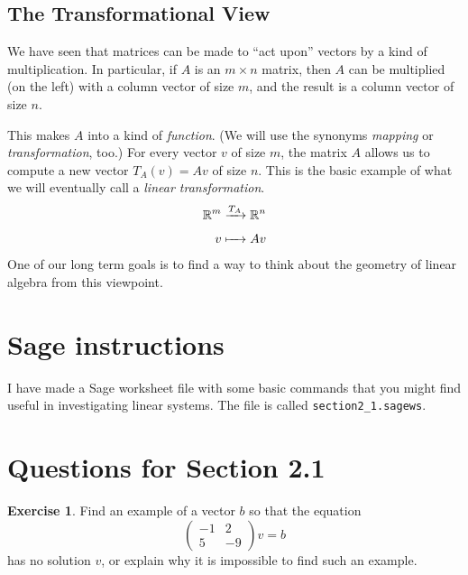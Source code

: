 \documentclass[11pt]{amsart}
\theoremstyle{definition}
\newtheorem{exercise}{Exercise}
\begin{document}
\subsection{The Transformational View}

We have seen that matrices can be made to ``act upon'' vectors by a kind of multiplication. In particular, if $A$ is an $m \times n$ matrix, then $A$ can be multiplied (on the left) with a column vector of size $m$, and the result is a column vector of size $n$.

This makes $A$ into a kind of \emph{function}. (We will use the synonyms \emph{mapping} or \emph{transformation}, too.)
For every vector $v$ of size $m$, the matrix $A$ allows us to compute a new vector $T_A(v) = Av$ of size $n$. This is the basic example of what we will eventually call a \emph{linear transformation}.
\begin{align*}
\mathbb{R}^m & \xrightarrow[]{T_A} \mathbb{R}^n \\
v & \xmapsto[]{\phantom{T_A}} Av
\end{align*}
One of our long term goals is to find a way to think about the geometry of linear algebra from this viewpoint.



\section{Sage instructions}

I have made a Sage worksheet file with some basic commands that you might find useful in investigating linear systems. The file is called \texttt{section2\_1.sagews}.


\section{Questions for Section 2.1}
\setcounter{exercise}{32}

\begin{exercise}
Find an example of a vector $b$ so that the equation
\[
\begin{pmatrix} -1 & 2 \\ 5 & -9\end{pmatrix} v = b
\]
has no solution $v$, or explain why it is impossible to find such an example.
\end{exercise}
\end{document}
